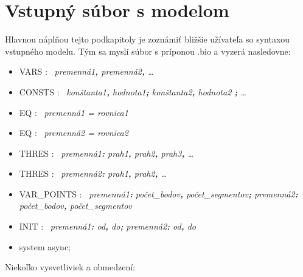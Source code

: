 \documentclass[11pt,final,oneside]{fithesis}
\begin{document}
\section{Vstupn\'y s\'ubor s modelom}
\label{sec:modelFile}
Hlavnou n\'apl\v nou tejto podkapitoly je zozn\'ami\v t bli\v z\v sie u\v z\'ivate\v la so syn\-taxou vstupn\'eho modelu. T\'ym sa mysl\'i s\'ubor s pr\'iponou
.bio a vyzer\'a nasledovne:
\begin{itemize}
\item VARS : \ \textit{premenn\'a1{\bf,} premenn\'a2{\bf,} \dots{}}
\item CONSTS : \ \textit{kon\v stanta1{\bf,} hodnota1{\bf;} kon\v stanta2{\bf,} hodnota2 {\bf;} \dots{}}
\item EQ : \ \textit{premenn\'a1 = rovnica1}
\item EQ : \ \textit{premenn\'a2 = rovnica2}
\item THRES : \ \textit{premenn\'a1{\bf:} prah1{\bf,} prah2{\bf,} prah3{\bf,} \dots{}}
\item THRES : \ \textit{premenn\'a2{\bf:} prah1{\bf,} prah2{\bf,} \dots{}}
\item VAR\_POINTS : \ \textit{premenn\'a1{\bf:} po\v cet\_bodov{\bf,} po\v cet\_segmentov{\bf;} premenn\'a2{\bf:} po\v cet\_bodov{\bf,} po\v cet\_segmentov}
\item INIT : \ \textit{premenn\'a1{\bf:} od{\bf,} do{\bf;} premenn\'a2{\bf:} od{\bf,} do}
\item system async;
\end{itemize}
Nieko\v lko vysvetliviek a obmedzen\'i:
\end{document}
